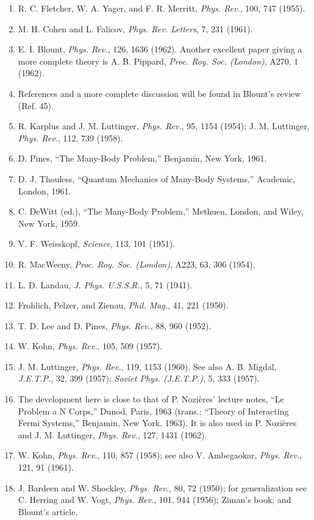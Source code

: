 \begin{enumerate}[label=(\arabic*),leftmargin=2.8em,itemsep=1pt,parsep=0pt]
\item R. C. Fletcher, W. A. Yager, and F. R. Merritt, \emph{Phys. Rev.}, 100, 747 (1955).
\item M. H. Cohen and L. Falicov, \emph{Phys. Rev. Letters}, 7, 231 (1961).
\item E. I. Blount, \emph{Phys. Rev.}, 126, 1636 (1962). Another excellent paper giving a more complete theory is A. B. Pippard, \emph{Proc. Roy. Soc. (London)}, A270, 1 (1962).
\item References and a more complete discussion will be found in Blount's review (Ref. 45).
\item R. Karplus and J. M. Luttinger, \emph{Phys. Rev.}, 95, 1154 (1954); J. M. Luttinger, \emph{Phys. Rev.}, 112, 739 (1958).
\item D. Pines, ``The Many-Body Problem,'' Benjamin, New York, 1961.
\item D. J. Thouless, ``Quantum Mechanics of Many-Body Systems,'' Academic, London, 1961.
\item C. DeWitt (ed.), ``The Many-Body Problem,'' Methuen, London, and Wiley, New York, 1959.
\item V. F. Weisskopf, \emph{Science}, 113, 101 (1951).
\item R. MacWeeny, \emph{Proc. Roy. Soc. (London)}, A223, 63, 306 (1954).
\item L. D. Landau, \emph{J. Phys. U.S.S.R.}, 5, 71 (1941).
\item Frohlich, Pelzer, and Zienau, \emph{Phil. Mag.}, 41, 221 (1950).
\item T. D. Lee and D. Pines, \emph{Phys. Rev.}, 88, 960 (1952).
\item W. Kohn, \emph{Phys. Rev.}, 105, 509 (1957).
\item J. M. Luttinger, \emph{Phys. Rev.}, 119, 1153 (1960). See also A. B. Migdal, \emph{J.E.T.P.}, 32, 399 (1957); \emph{Soviet Phys. (J.E.T.P.)}, 5, 333 (1957).
\item The development here is close to that of P. Nozi\`eres' lecture notes, ``Le Problem a N Corps,'' Dunod, Paris, 1963 (trans.: ``Theory of Interacting Fermi Systems,'' Benjamin, New York, 1963). It is also used in P. Nozi\`eres and J. M. Luttinger, \emph{Phys. Rev.}, 127, 1431 (1962).
\item W. Kohn, \emph{Phys. Rev.}, 110, 857 (1958); see also V. Ambegaokar, \emph{Phys. Rev.}, 121, 91 (1961).
\item J. Bardeen and W. Shockley, \emph{Phys. Rev.}, 80, 72 (1950); for generalization see C. Herring and W. Vogt, \emph{Phys. Rev.}, 101, 944 (1956); Ziman's book; and Blount's article.

\end{enumerate}
